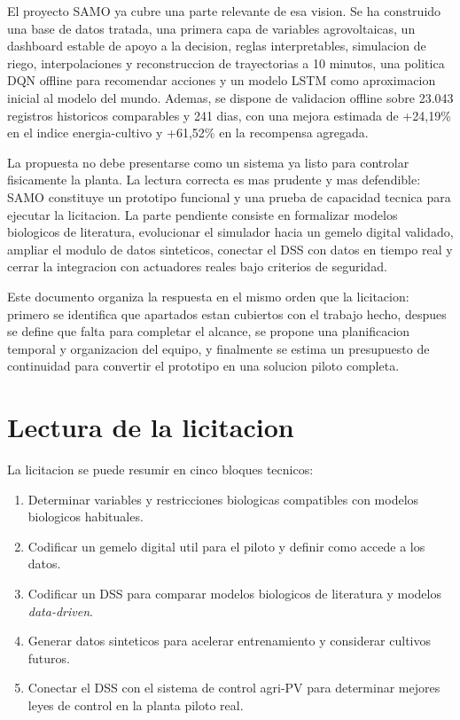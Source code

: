 ﻿\documentclass[11pt,a4paper]{article}
\begin{document}
El proyecto SAMO ya cubre una parte relevante de esa vision. Se ha construido una base de datos tratada, una primera capa de variables agrovoltaicas, un dashboard estable de apoyo a la decision, reglas interpretables, simulacion de riego, interpolaciones y reconstruccion de trayectorias a 10 minutos, una politica DQN offline para recomendar acciones y un modelo LSTM como aproximacion inicial al modelo del mundo. Ademas, se dispone de validacion offline sobre 23.043 registros historicos comparables y 241 dias, con una mejora estimada de +24,19\% en el indice energia-cultivo y +61,52\% en la recompensa agregada.

La propuesta no debe presentarse como un sistema ya listo para controlar fisicamente la planta. La lectura correcta es mas prudente y mas defendible: SAMO constituye un prototipo funcional y una prueba de capacidad tecnica para ejecutar la licitacion. La parte pendiente consiste en formalizar modelos biologicos de literatura, evolucionar el simulador hacia un gemelo digital validado, ampliar el modulo de datos sinteticos, conectar el DSS con datos en tiempo real y cerrar la integracion con actuadores reales bajo criterios de seguridad.

Este documento organiza la respuesta en el mismo orden que la licitacion: primero se identifica que apartados estan cubiertos con el trabajo hecho, despues se define que falta para completar el alcance, se propone una planificacion temporal y organizacion del equipo, y finalmente se estima un presupuesto de continuidad para convertir el prototipo en una solucion piloto completa.

\newpage

\section{Lectura de la licitacion}

La licitacion se puede resumir en cinco bloques tecnicos:

\begin{enumerate}
    \item Determinar variables y restricciones biologicas compatibles con modelos biologicos habituales.
    \item Codificar un gemelo digital util para el piloto y definir como accede a los datos.
    \item Codificar un DSS para comparar modelos biologicos de literatura y modelos \textit{data-driven}.
    \item Generar datos sinteticos para acelerar entrenamiento y considerar cultivos futuros.
    \item Conectar el DSS con el sistema de control agri-PV para determinar mejores leyes de control en la planta piloto real.
\end{enumerate}
\end{document}
